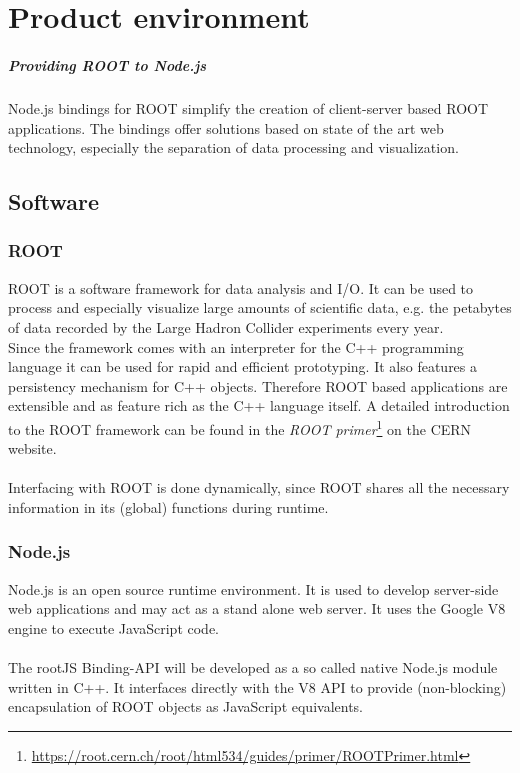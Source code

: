 \chapter{Product environment}

\paragraph{Providing ROOT to Node.js}
Node.js bindings for ROOT simplify the creation of client-server based ROOT applications. The bindings offer solutions based on state of the art web technology, especially the separation of data processing and visualization.\\

\section{Software}
\subsection{ROOT}

ROOT is a software framework for data analysis and I/O. It can be used to process and especially visualize large amounts of scientific data, e.g. the petabytes of data recorded by the Large Hadron Collider experiments every year.\\
Since the framework comes with an interpreter for the C++ programming language it can be used for rapid and efficient prototyping. It also features a persistency mechanism for C++ objects. Therefore ROOT based applications are extensible and as feature rich as the C++ language itself.
A detailed introduction to the ROOT framework can be found in the \textit{ROOT  primer}\footnote[1]{\url{https://root.cern.ch/root/html534/guides/primer/ROOTPrimer.html}}
on the CERN website. \\ \\
Interfacing with ROOT is done dynamically, since ROOT shares all the necessary information in its (global) functions during runtime.

\subsection{Node.js}

Node.js is an open source runtime environment. It is used to develop server-side web applications and may act as a stand alone web server. It uses the Google V8 engine to execute JavaScript code. \\ \\
The rootJS Binding-API will be developed as a so called native Node.js module written in C++. It interfaces directly with the V8 API to provide (non-blocking) encapsulation of ROOT objects as JavaScript equivalents.

